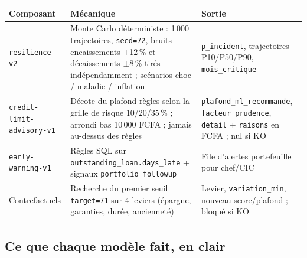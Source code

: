 \documentclass[11pt,a4paper]{article}
\begin{document}
\begin{center}
\footnotesize
\renewcommand{\arraystretch}{1.3}
\begin{tabularx}{\linewidth}{>{\raggedright\arraybackslash}p{3.6cm}>{\raggedright\arraybackslash}X>{\raggedright\arraybackslash}p{4.2cm}}
\toprule
\textbf{Composant} & \textbf{Mécanique} & \textbf{Sortie} \\
\midrule
\texttt{resilience-v2} & Monte Carlo déterministe : 1\,000 trajectoires, \texttt{seed=72}, bruits encaissements $\pm$12\,\% et décaissements $\pm$8\,\% tirés indépendamment ; scénarios choc / maladie / inflation & \texttt{p\_incident}, trajectoires P10/P50/P90, \texttt{mois\_critique} \\
\texttt{credit-limit-}\hspace{0pt}\texttt{advisory-v1} & Décote du plafond règles selon la grille de risque 10/20/35\,\% ; arrondi bas 10\,000 FCFA ; jamais au-dessus des règles & \texttt{plafond\_ml\_recommande}, \texttt{facteur\_prudence}, \texttt{detail} + \texttt{raisons} en FCFA ; nul si KO \\
\texttt{early-warning-v1} & Règles SQL sur \texttt{outstanding\_loan.days\_late} + signaux \texttt{portfolio\_followup} & File d'alertes portefeuille pour chef/CIC \\
Contrefactuels & Recherche du premier seuil \texttt{target=71} sur 4 leviers (épargne, garanties, durée, ancienneté) & Levier, \texttt{variation\_min}, nouveau score/plafond ; bloqué si KO \\
\bottomrule
\end{tabularx}
\end{center}

\subsection{Ce que chaque modèle fait, en clair}
\end{document}
